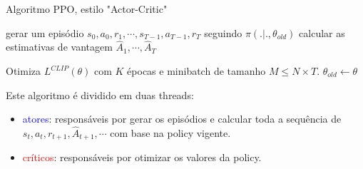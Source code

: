 \documentclass{beamer}
\begin{document}
%
%	
%	
%	


\begin{frame}{Algoritmo PPO, estilo "Actor-Critic"}
	
	\begin{algorithmic} 
		\STATE \TA gerar um episódio ${s_{0},a_{0},r_{1},\cdots,s_{T-1},a_{T-1},r_{T}}$ seguindo $\pi(.|.,\theta_{old})$
		\STATE \TA calcular as estimativas de vantagem $\hat{A}_{1}, \cdots, \hat{A}_{T}$
		\ENDFOR
		
		\STATE \TB Otimiza $L^{CLIP}(\theta)$ com $K$ épocas e minibatch de tamanho $M \leq N \times T$. 
		\STATE \TB $\theta_{old} \leftarrow \theta$
		
		\ENDFOR
	\end{algorithmic}	

Este algoritmo é dividido em duas threads: 

\begin{itemize}
	\item \textcolor{blue}{atores}: responsáveis por gerar os episódios e calcular toda a sequência de $s_t, a_t, r_{t+1}, \hat{A}_{t+1}, \cdots$ com base na policy vigente.
	\item \textcolor{red}{críticos}: responsáveis por otimizar os valores da policy. 
\end{itemize}
	
\end{frame}
\end{document}
